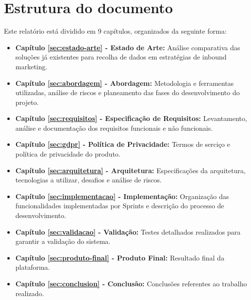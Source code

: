 \section{Estrutura do documento}
\label{subsec:estrutura}

Este relatório está dividido em 9 capítulos, organizados da seguinte forma:
\begin{itemize}
	 \item \textbf{Capítulo \ref{sec:estado-arte} - Estado de Arte: }Análise comparativa das soluções já existentes para recolha de dados em estratégias de inbound marketing.
	
	\item \textbf{Capítulo \ref{sec:abordagem} - Abordagem: }Metodologia e ferramentas utilizadas, análise de riscos e planeamento das fases do desenvolvimento do projeto.
	
	\item \textbf{Capítulo \ref{sec:requisitos} - Especificação de Requisitos: }Levantamento, análise e documentação dos requisitos funcionais e não funcionais.
	
	\item \textbf{Capítulo \ref{sec:gdpr} - Política de Privacidade: }Termos de serciço e política de privacidade do produto.
	
	\item \textbf{Capítulo \ref{sec:arquitetura} - Arquitetura: }Especificações da arquitetura, tecnologias a utilizar, desafios e análise de riscos.
	
	
	\item \textbf{Capítulo \ref{sec:implementacao} - Implementação: }Organização das funcionalidades implementadas por Sprints e descrição do processo de desenvolvimento.
	
	\item \textbf{Capítulo \ref{sec:validacao} - Validação: }Testes detalhados realizados para garantir a validação do sistema.
	
	\item \textbf{Capítulo \ref{sec:produto-final} - Produto Final: }Resultado final da plataforma.

	\item \textbf{Capítulo \ref{sec:conclusion} - Conclusão: }Conclusões referentes ao trabalho realizado.
	
\end{itemize}



\blankpage

\glsresetall



